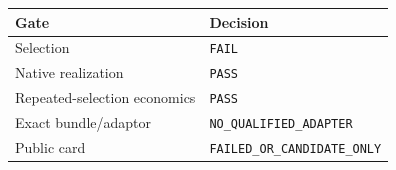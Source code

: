 \begin{tabular}{ll}
\toprule
Gate & Decision \\
\midrule
Selection & \texttt{FAIL} \\
Native realization & \texttt{PASS} \\
Repeated-selection economics & \texttt{PASS} \\
Exact bundle/adaptor & \texttt{NO\_QUALIFIED\_ADAPTER} \\
Public card & \texttt{FAILED\_OR\_CANDIDATE\_ONLY} \\
\bottomrule
\end{tabular}
